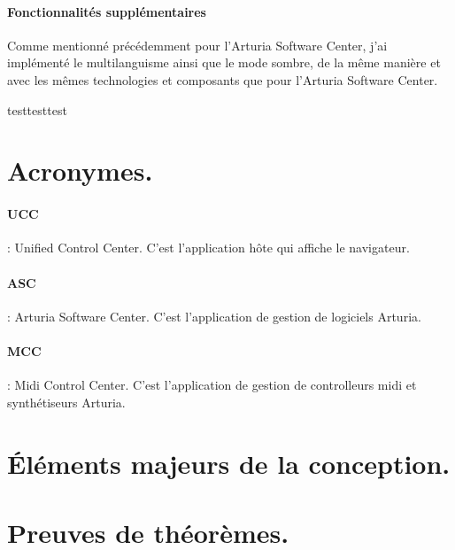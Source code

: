 \documentclass[francais]{rapportPFE}  %
\begin{document}
\paragraph{Fonctionnalités supplémentaires}
Comme mentionné précédemment pour l'Arturia Software Center, j'ai implémenté le multilanguisme ainsi que le mode sombre, de la même manière et avec les mêmes technologies et composants que pour l'Arturia Software Center.



%
 
 
 
 
 
 





testtesttest


\appendix
\section{Acronymes.}
\paragraph{UCC}: Unified Control Center. C'est l'application hôte qui affiche le navigateur.
\paragraph{ASC}: Arturia Software Center. C'est l'application de gestion de logiciels Arturia.
\paragraph{MCC}: Midi Control Center. C'est l'application de gestion de controlleurs midi et synthétiseurs Arturia.

\section{Éléments majeurs de la conception.}

\section{Preuves de théorèmes.}
\end{document}
